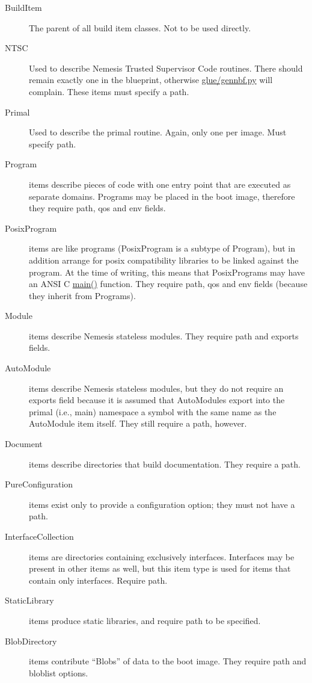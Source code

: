 \documentclass[a4paper]{article}
\begin{document}
\begin{description}
\item[BuildItem] The parent of all build item classes. Not to be used
directly.

\item[NTSC] Used to describe Nemesis Trusted Supervisor Code
routines. There should remain exactly one in the blueprint, otherwise
\url{glue/gennbf.py} will complain. These items must specify a path.

\item[Primal] Used to describe the primal routine. Again, only one per
image. Must specify path.

\item[Program] items describe pieces of code with one entry point that
are executed as separate domains. Programs may be placed in the boot
image, therefore they require path, qos and env fields.

\item[PosixProgram] items are like programs (PosixProgram is a subtype
of Program), but in addition arrange for posix compatibility libraries
to be linked against the program. At the time of writing, this means
that PosixPrograms may have an ANSI C \url{main()} function. They
require path, qos and env fields (because they inherit from Programs).

\item[Module] items describe Nemesis stateless modules. They require
path and exports fields.

\item[AutoModule] items describe Nemesis stateless modules, but they
do not require an exports field because it is assumed that AutoModules
export into the primal (i.e., main) namespace a symbol with the same name
as the AutoModule item itself.  They still require a path, however.

\item[Document] items describe directories that build
documentation. They require a path.

\item[PureConfiguration] items exist only to provide a configuration
option; they must not have a path.

\item[InterfaceCollection] items are directories containing
exclusively interfaces. Interfaces may be present in other items as
well, but this item type is used for items that contain only
interfaces. Require path.

\item[StaticLibrary] items produce static libraries, and require path
to be specified.

\item[BlobDirectory] items contribute ``Blobs'' of data to the boot
image. They require path and bloblist options.

\end{description}
\end{document}

